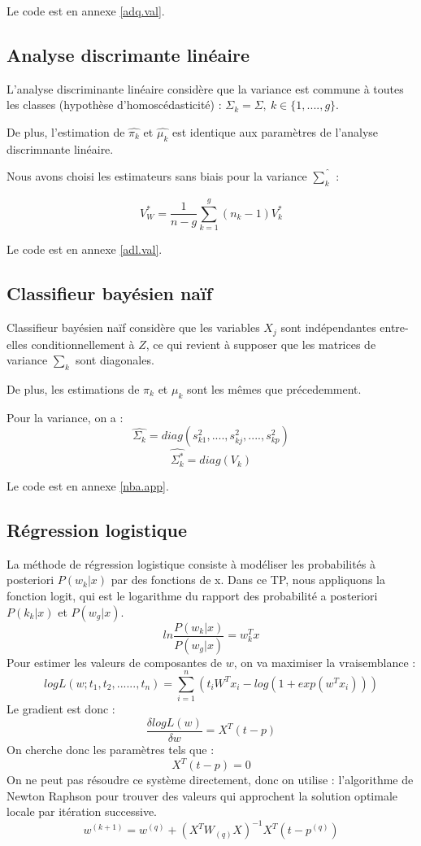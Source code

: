 \documentclass{article}
\begin{document}
Le code est en annexe \ref{adq.val}.


\subsection{Analyse discrimante linéaire}

L'analyse discriminante linéaire considère que la variance est commune à toutes les classes (hypothèse d'homoscédasticité) : $\Sigma_k=\Sigma,~ k \in \lbrace1, ...., g\rbrace$. 
\medskip

De plus, l'estimation de $\widehat{\pi_k}$ et $\widehat{\mu_k}$ est identique aux paramètres de l'analyse discrimnante linéaire.
\smallskip

Nous avons choisi les estimateurs sans biais pour la variance $ \widehat{\sum_k}  $ :

  \[
   V_W^* =\frac{1}{n-g} \sum_{k=1}^g (n_k-1) V_k^*
\]

Le code est en annexe \ref{adl.val}.

\subsection{Classifieur bayésien naïf}

Classifieur bayésien naïf considère que les variables $X_j$ sont indépendantes entre-elles conditionnellement à $Z$, ce qui revient à supposer que les matrices de variance $\sum_k$ sont diagonales.
\medskip

De plus, les estimations de $\pi_k$ et $\mu_k$ sont les mêmes que précedemment.

Pour la variance, on a :
  \[
   \widehat{\Sigma_k} = diag(s_{k1}^2, ...., s_{kj}^2, ...., s_{kp}^2)
\]
 \[
   \widehat{\Sigma_k^*} = diag(V_k)
\]

Le code est en annexe \ref{nba.app}.











\subsection{Régression logistique}
La méthode de régression logistique consiste à modéliser les probabilités à posteriori $P( w_k | x )$ par des fonctions de x.
Dans ce TP, nous appliquons la fonction logit, qui est le logarithme du rapport des probabilité a posteriori $P(k_k | x)$ et $P(w_g|x )$.
\[
	ln\frac{P(w_k|x)}{P(w_g|x)}=w_k^Tx
\]
Pour estimer les valeurs de composantes de $w$, on va maximiser la vraisemblance :
\[
logL(w;t_1,t_2,......,t_n)=\sum_{i=1}^{n}(t_iW^Tx_i-log(1+exp(w^Tx_i)))
\]
Le gradient est donc :
\[
\frac{\delta logL(w)}{\delta w}=X^T(t-p)
\]
On cherche donc les paramètres tels que :
\[
X^T(t-p)=0
\]
On ne peut pas résoudre ce système directement, donc on utilise : l'algorithme de Newton Raphson pour trouver des valeurs qui approchent la solution optimale locale par itération successive.
\[
w^{(k+1)}=w^{(q)}+(X^TW_{(q)}X)^{-1}X^T(t-p^{(q)})
\]
\end{document}
